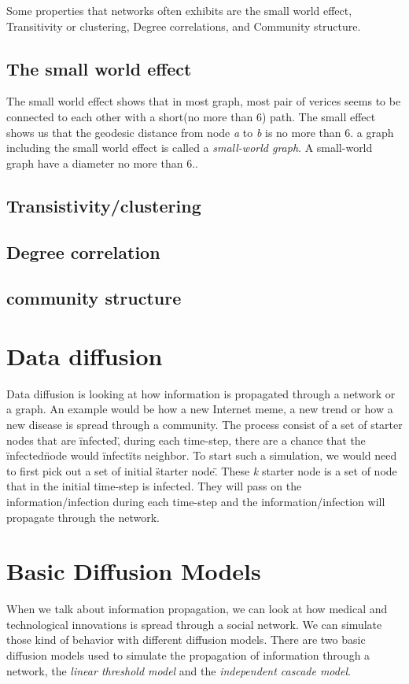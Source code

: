 Some properties that networks often exhibits are the small world effect, Transitivity or clustering, Degree correlations, and Community structure\cite{ComplexNetwork2003}.

\subsection{The small world effect}
The small world effect shows that in most graph, most pair of verices seems to be connected to each other with a short(no more than 6) path\cite{ComplexNetwork2003}. The small effect shows us that the geodesic distance from node {\it a} to {\it b} is no more than 6. a graph including the small world effect is called a {\it small-world graph}. A small-world graph have a diameter no more than 6.. 

\subsection{Transistivity/clustering}


\subsection{Degree correlation}

\subsection{community structure}



\section{Data diffusion}
Data diffusion is looking at how information is propagated through a network or a graph. An example would be how a new Internet meme, a new trend or how a new disease is spread through a community. The process consist of a set of starter nodes that are \"infected\", during each time-step, there are a chance that the \"infected\" node would \"infect\" its neighbor. To start such a simulation, we would need to first pick out a set of initial \"starter node\". These {\it k} starter node is a set of node that in the initial time-step is infected. They will pass on the information/infection during each time-step and the information/infection will propagate through the network.

\section{Basic Diffusion Models}
When we talk about information propagation, we can look at how medical and technological innovations is spread through a social network. We can simulate those kind of behavior with different diffusion models. There are two basic diffusion models used to simulate the propagation of information through a network\cite{MaximizeSpread2003}, the {\it linear threshold model} and the {\it independent cascade model}\cite{MaximizeSpread2003}.

